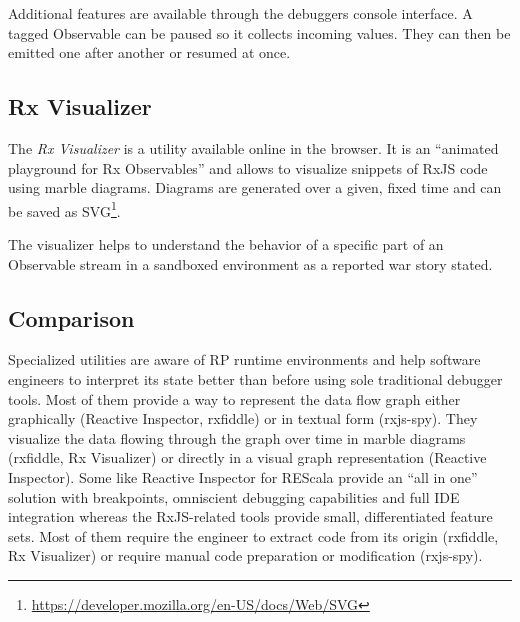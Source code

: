 \documentclass[12pt,a4paper]{article}
\begin{document}
Additional features are available through the debuggers console interface. A tagged Observable can be paused so it collects incoming values. They can then be emitted one after another or resumed at once.

\subsection{Rx Visualizer}

The \emph{Rx Visualizer}\cite{rxviz} is a utility available online in the browser. It is an ``animated playground for Rx Observables''\cite{rxviz} and allows to visualize snippets of RxJS code using marble diagrams. Diagrams are generated over a given, fixed time and can be saved as SVG\footnote{\url{https://developer.mozilla.org/en-US/docs/Web/SVG}}.

The visualizer helps to understand the behavior of a specific part of an Observable stream in a sandboxed environment as a reported war story stated.

\subsection{Comparison}

Specialized utilities are aware of RP runtime environments and help software engineers to interpret its state better than before using sole traditional debugger tools. Most of them provide a way to represent the data flow graph either graphically (Reactive Inspector, rxfiddle) or in textual form (rxjs-spy). They visualize the data flowing through the graph over time in marble diagrams (rxfiddle, Rx Visualizer) or directly in a visual graph representation (Reactive Inspector). Some like Reactive Inspector for REScala provide an ``all in one'' solution with breakpoints, omniscient debugging capabilities and full IDE integration whereas the RxJS-related tools provide small, differentiated feature sets. Most of them require the engineer to extract code from its origin (rxfiddle, Rx Visualizer) or require manual code preparation or modification (rxjs-spy).
\end{document}
